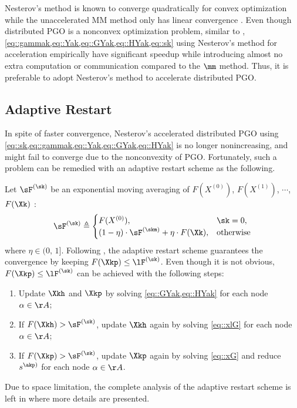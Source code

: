 Nesterov's method is known to converge quadratically for convex optimization while the unaccelerated MM method only has linear convergence  \cite{nesterov1983method,nesterov2013introductory}. Even though distributed PGO is a nonconvex optimization problem, similar to \cite{fan2019proximal,fan2020mm},  \cref{eq::gammak,eq::Yak,eq::GYak,eq::HYak,eq::sk} using  Nesterov's method for acceleration  empirically have significant speedup while introducing  almost no extra computation or communication compared to the $\mm$ method. Thus, it is preferable to adopt Nesterov's method to accelerate distributed PGO.

\vspace{-0.5em}
\subsection{Adaptive Restart}\label{section::ammc::adaptive}
In spite of faster convergence, Nesterov's accelerated distributed PGO using \cref{eq::sk,eq::gammak,eq::Yak,eq::GYak,eq::HYak} is no longer nonincreasing, and might fail to converge due to the nonconvexity of PGO. Fortunately, such a problem can be remedied with an adaptive restart scheme \cite{o2015adaptive,fan2020mm,fan2019proximal} as the following.

Let $\sF^{(\sk)}$ be an exponential moving averaging of $F(X^{(0)})$, $F(X^{(1)})$, $\cdots$, $F(\Xk)$ :
\begin{equation}\label{eq::lFk}
	\sF^{(\sk)}\triangleq \begin{cases}
		F(X^{(0)}),& \sk=0,\\
		(1-\eta)\cdot\sF^{(\skm)}+\eta\cdot F(\Xk),&\text{otherwise}
	\end{cases}
\end{equation}
where $\eta\in(0,\,1]$.  {\highlight Following \cite{fan2019proximal,li2015accelerated,zhang2004nonmonotone}, the adaptive restart scheme guarantees the convergence by keeping $F(\Xkp)\leq \lF^{(\sk)}$. Even though it is not obvious, $F(\Xkp)\leq \lF^{(\sk)}$  can be achieved with the following steps}:
\begin{enumerate}[leftmargin=0.45cm]
\item  Update $\Xkh$ and $\Xkp$ by solving \cref{eq::GYak,eq::HYak} for each node $\alpha\in\AA$;
\item If $F(\Xkh)>\sF^{(\sk)}$, update $\Xkh$ again by solving  \cref{eq::xlG} for each node $\alpha\in\AA$;
\item If $F(\Xkp)>\sF^{(\sk)}$, update $\Xkp$ again by solving  \cref{eq::xG}  and reduce $s^{\akp)}$  for each node $\alpha\in\AA$.  
\end{enumerate}
{\highlight Due to space limitation, the complete analysis of the adaptive restart scheme  is left in   where more details are presented.}

